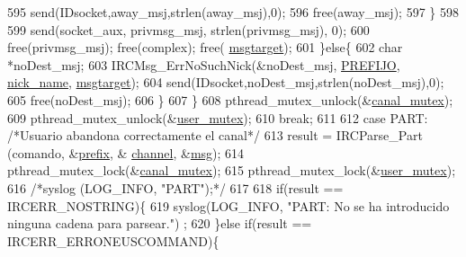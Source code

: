 \begin{DoxyCode}
{{{{{{{{{{595                                                 send(IDsocket,away\_msj,strlen(away\_msj),0);
596                                                 free(away\_msj);
597                                         \}
598 
599                                         send(socket\_aux, privmsg\_msj, strlen(privmsg\_msj), 0);
600                                         free(privmsg\_msj); free(complex); free(
      \hyperlink{_g-2361-06-_p1-_server_8c_a968dcc7e43caeca7959f3c069dcccc6a}{msgtarget}); 
601                                 \}\textcolor{keywordflow}{else}\{
602                                         \textcolor{keywordtype}{char} *noDest\_msj;
603                                         IRCMsg\_ErrNoSuchNick(&noDest\_msj, 
      \hyperlink{_g-2361-06-_p1-_server_8h_a78c658ff923693099f7b621e7c351129}{PREFIJO}, \hyperlink{_g-2361-06-_p1-_server_8c_aabbf66718cda228b924a4a9441eadf62}{nick\_name}, \hyperlink{_g-2361-06-_p1-_server_8c_a968dcc7e43caeca7959f3c069dcccc6a}{msgtarget});
604                                         send(IDsocket,noDest\_msj,strlen(noDest\_msj),0);
605                                         free(noDest\_msj); 
606                                 \}
607                         \}
608                         pthread\_mutex\_unlock(&\hyperlink{_g-2361-06-_p1-_server_8c_ab86a544a49de18195048bac54dd3ac3e}{canal\_mutex});
609                         pthread\_mutex\_unlock(&\hyperlink{_g-2361-06-_p1-_server_8c_a5dedd07a1144d2ab70b74a8e64b6a7c0}{user\_mutex});
610                         \textcolor{keywordflow}{break};
611 
612                 \textcolor{keywordflow}{case} PART: \textcolor{comment}{/*Usuario abandona correctamente el canal*/}
613                         result =  IRCParse\_Part (comando, &\hyperlink{_g-2361-06-_p1-_server_8c_ad2849cf781a4db22cc1b31eaaee50a4f}{prefix}, &
      \hyperlink{_g-2361-06-_p1-_server_8c_a842ca2f026578e5c479c095ff3335969}{channel}, &\hyperlink{_g-2361-06-_p1-_server_8c_a32d2f5216cddb59c7cc8fb2806a7e727}{msg});
614                         pthread\_mutex\_lock(&\hyperlink{_g-2361-06-_p1-_server_8c_ab86a544a49de18195048bac54dd3ac3e}{canal\_mutex});
615                         pthread\_mutex\_lock(&\hyperlink{_g-2361-06-_p1-_server_8c_a5dedd07a1144d2ab70b74a8e64b6a7c0}{user\_mutex});
616                         \textcolor{comment}{/*syslog (LOG\_INFO, "PART");*/}
617 
618                         \textcolor{keywordflow}{if}(result == IRCERR\_NOSTRING)\{
619                                 syslog(LOG\_INFO, \textcolor{stringliteral}{"PART: No se ha introducido ninguna cadena para parsear."})
      ;
620                         \}\textcolor{keywordflow}{else} \textcolor{keywordflow}{if}(result == IRCERR\_ERRONEUSCOMMAND)\{
}}}}}}}}}}
\end{DoxyCode}
